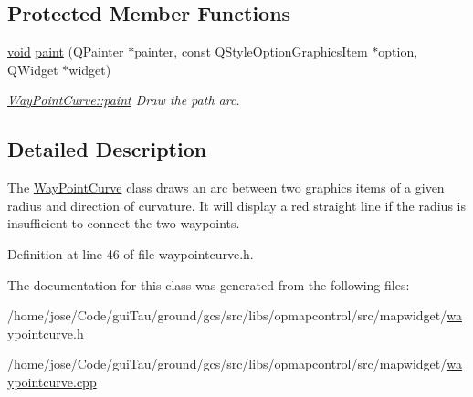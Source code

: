 \subsection*{Protected Member Functions}
\begin{DoxyCompactItemize}
\item 
\hyperlink{group___u_a_v_objects_plugin_ga444cf2ff3f0ecbe028adce838d373f5c}{void} \hyperlink{group___o_p_map_widget_gaa2b1fdb88cca171d82b5705989370729}{paint} (Q\-Painter $\ast$painter, const Q\-Style\-Option\-Graphics\-Item $\ast$option, Q\-Widget $\ast$widget)
\begin{DoxyCompactList}\small\item\em \hyperlink{group___o_p_map_widget_gaa2b1fdb88cca171d82b5705989370729}{Way\-Point\-Curve\-::paint} Draw the path arc. \end{DoxyCompactList}\end{DoxyCompactItemize}


\subsection{Detailed Description}
The \hyperlink{classmapcontrol_1_1_way_point_curve}{Way\-Point\-Curve} class draws an arc between two graphics items of a given radius and direction of curvature. It will display a red straight line if the radius is insufficient to connect the two waypoints. 

Definition at line 46 of file waypointcurve.\-h.



The documentation for this class was generated from the following files\-:\begin{DoxyCompactItemize}
\item 
/home/jose/\-Code/gui\-Tau/ground/gcs/src/libs/opmapcontrol/src/mapwidget/\hyperlink{waypointcurve_8h}{waypointcurve.\-h}\item 
/home/jose/\-Code/gui\-Tau/ground/gcs/src/libs/opmapcontrol/src/mapwidget/\hyperlink{waypointcurve_8cpp}{waypointcurve.\-cpp}\end{DoxyCompactItemize}
